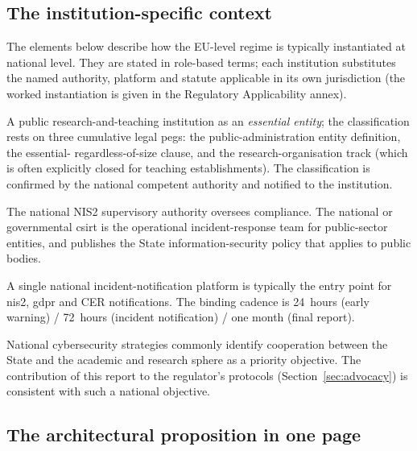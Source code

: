 \subsection{The institution-specific context}

The elements below describe how the EU-level regime is typically
instantiated at national level. They are stated in role-based terms;
each institution substitutes the named authority, platform and
statute applicable in its own jurisdiction (the worked instantiation
is given in the Regulatory Applicability annex).

\begin{description}[nosep]
    \item[Status.] A public
    research-and-teaching institution  as an
    \emph{essential entity}; the
    classification rests on three cumulative legal pegs:
    the public-administration entity definition, the essential-%
    regardless-of-size clause, and the research-organisation track
    (which is often explicitly closed for teaching establishments).
    The classification is confirmed by the national competent
    authority and notified to the institution.

    \item[Supervisory chain.] The national NIS2 supervisory
    authority oversees compliance. The national or governmental
    \gls{csirt} is the operational incident-response team
    for public-sector entities, and 
    publishes the State information-security policy that
    applies to public bodies.

    \item[Notification platform.] A single national
    incident-notification platform is typically the entry point for
    \gls{nis2}, \gls{gdpr} and CER notifications. The binding
    cadence is 24~hours (early warning) / 72~hours (incident
    notification) / one month (final report).

    \item[National strategy hook.] National cybersecurity strategies
    commonly identify cooperation between the State and the
    academic and research sphere as a priority objective. The
    contribution of this report to the regulator's protocols
    (Section~\ref{sec:advocacy}) is consistent with such a
    national objective.
\end{description}

\subsection{The architectural proposition in one page}

